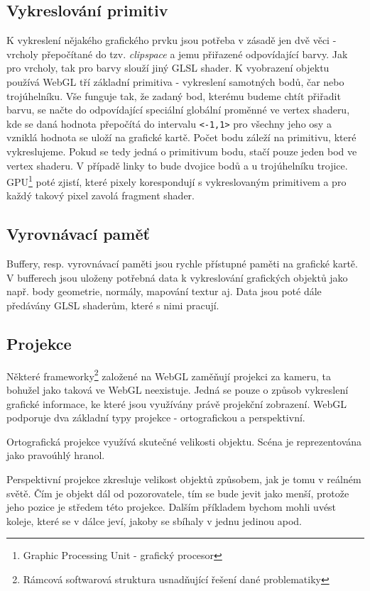\subsection{Vykreslování primitiv}
K vykreslení nějakého grafického prvku jsou potřeba v zásadě jen dvě věci - vrcholy přepočítané do tzv. \textit{clipspace} a jemu přiřazené odpovídající barvy. Jak pro vrcholy, tak pro barvy slouží jiný GLSL shader. K vyobrazení objektu používá WebGL tří základní primitiva - vykreslení samotných bodů, čar nebo trojúhelníku. Vše funguje tak, že zadaný bod, kterému budeme chtít přiřadit barvu, se načte do odpovídající speciální globální proměnné ve vertex shaderu, kde se daná hodnota přepočítá do intervalu \texttt{<-1,1>} pro všechny jeho osy a vzniklá hodnota se uloží na grafické kartě. Počet bodu záleží na primitivu, které vykreslujeme. Pokud se tedy jedná o primitivum bodu, stačí pouze jeden bod ve vertex shaderu. V případě linky to bude dvojice bodů a u trojúhelníku trojice. GPU\footnote{Graphic Processing Unit - grafický procesor} poté zjistí, které pixely korespondují s vykreslovaným primitivem a pro každý takový pixel zavolá fragment shader. 


\subsection{Vyrovnávací paměť}
Buffery, resp. vyrovnávací paměti jsou rychle přístupné paměti na grafické kartě. V bufferech jsou  uloženy potřebná data k vykreslování grafických objektů jako např. body geometrie, normály, mapování textur aj. Data jsou poté dále předávány GLSL shaderům, které s nimi pracují.


\newpage

\subsection{Projekce}
Některé frameworky\footnote{Rámcová softwarová struktura usnadňující řešení dané problematiky} založené na WebGL zaměňují projekci za kameru, ta bohužel jako taková ve WebGL neexistuje. Jedná se pouze o způsob vykreslení grafické informace, ke které jsou využívány právě projekční zobrazení. WebGL podporuje dva základní typy projekce - ortografickou a perspektivní. 

Ortografická projekce využívá skutečné velikosti objektu. Scéna je reprezentována jako pravoúhlý hranol.

Perspektivní projekce zkresluje velikost objektů způsobem, jak je tomu v reálném světě. Čím je objekt dál od pozorovatele, tím se bude jevit jako menší, protože jeho pozice je středem této projekce. Dalším příkladem bychom mohli uvést koleje, které se v dálce jeví, jakoby se sbíhaly v jednu jedinou apod.
  
